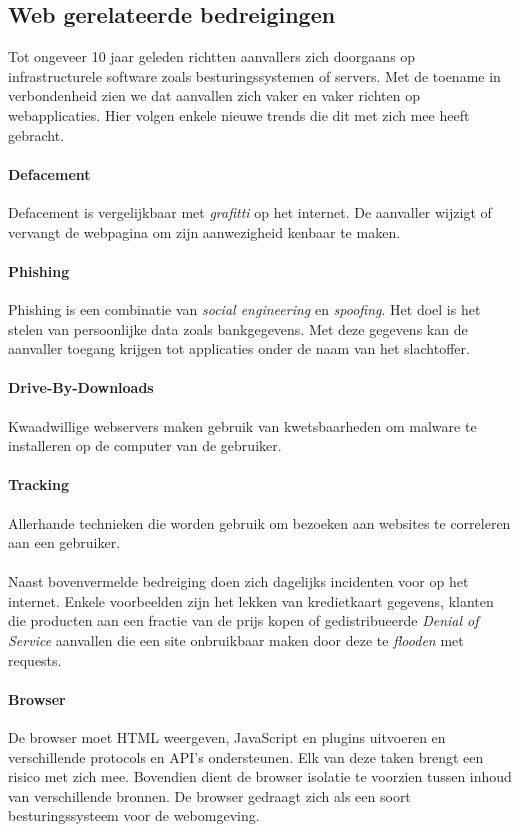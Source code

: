 \documentclass[../main.tex]{subfiles}
\begin{document}
\subsection{Web gerelateerde bedreigingen}
Tot ongeveer 10 jaar geleden richtten aanvallers zich doorgaans op infrastructurele software zoals besturingssystemen of servers. Met de toename in verbondenheid zien we dat aanvallen zich vaker en vaker richten op webapplicaties. Hier volgen enkele nieuwe trends die dit met zich mee heeft gebracht.

\paragraph{Defacement} Defacement is vergelijkbaar met \textit{grafitti} op het internet. De aanvaller wijzigt of vervangt de webpagina om zijn aanwezigheid kenbaar te maken. 

\paragraph{Phishing} Phishing is een combinatie van \textit{social engineering} en \textit{spoofing}. Het doel is het stelen van persoonlijke data zoals bankgegevens. Met deze gegevens kan de aanvaller toegang krijgen tot applicaties onder de naam van het slachtoffer.

\paragraph{Drive-By-Downloads} Kwaadwillige webservers maken gebruik van kwetsbaarheden om malware te installeren op de computer van de gebruiker.

\paragraph{Tracking} Allerhande technieken die worden gebruik om bezoeken aan websites te correleren aan een gebruiker. 
\\\\
Naast bovenvermelde bedreiging doen zich dagelijks incidenten voor op het internet. Enkele voorbeelden zijn het lekken van kredietkaart gegevens, klanten die producten aan een fractie van de prijs kopen of gedistribueerde \textit{Denial of Service} aanvallen die een site onbruikbaar maken door deze te \textit{flooden} met requests.



\paragraph{Browser} De browser moet HTML weergeven, JavaScript en plugins uitvoeren en verschillende protocols en API's ondersteunen. Elk van deze taken brengt een risico met zich mee. Bovendien dient de browser isolatie te voorzien tussen inhoud van verschillende bronnen. De browser gedraagt zich als een soort besturingssysteem voor de webomgeving.
\end{document}
